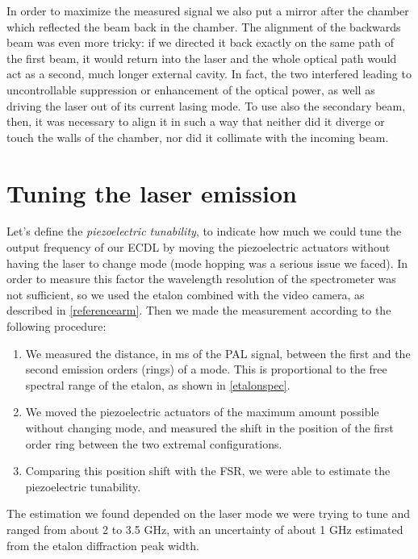 \medskip

In order to maximize the measured signal we also put a mirror after the chamber which reflected the beam back in the chamber. The alignment of the backwards beam was even more tricky: if we directed it back exactly on the same path of the first beam, it would return into the laser and the whole optical path would act as a second, much longer external cavity. In fact, the two interfered leading to uncontrollable suppression or enhancement of the optical power, as well as driving the laser out of its current lasing mode. To use also the secondary beam, then, it was necessary to align it in such a way that neither did it diverge or touch the walls of the chamber, nor did it collimate with the incoming beam.

	\section{Tuning the laser emission} 
Let's define the \textit{piezoelectric tunability}, to indicate how much we could tune the output frequency of our ECDL by moving the piezoelectric actuators without having the laser to change mode (mode hopping was a serious issue we faced). In order to measure this factor the wavelength resolution of the spectrometer was not sufficient, so we used the etalon combined with the video camera, as described in \cref{referencearm}. Then we made the measurement according to the following procedure:
\begin{enumerate}
\item We measured the distance, in ms of the PAL signal, between the first and the second emission orders (rings) of a mode. This is proportional to the free spectral range of the etalon, as shown in \cref{etalonspec}.
\item We moved the piezoelectric actuators of the maximum amount possible without changing mode, and measured the shift in the position of the first order ring between the two extremal configurations.
\item Comparing this position shift with the FSR, we were able to estimate the piezoelectric tunability.
\end{enumerate}
The estimation we found depended on the laser mode we were trying to tune and ranged from about 2 to 3.5 GHz, with an uncertainty of about 1 GHz estimated from the etalon diffraction peak width.

